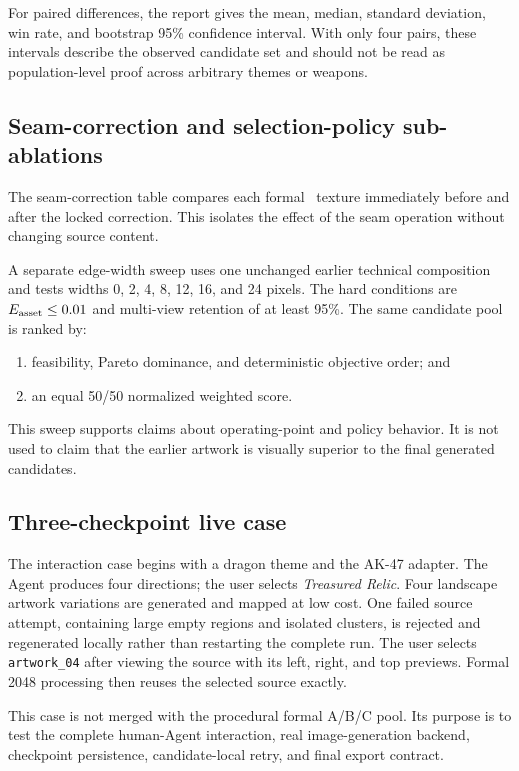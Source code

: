 For paired differences, the report gives the mean, median, standard deviation, win
rate, and bootstrap 95\% confidence interval. With only four pairs, these intervals
describe the observed candidate set and should not be read as population-level
proof across arbitrary themes or weapons.

\subsection{Seam-correction and selection-policy sub-ablations}

The seam-correction table compares each formal \routeB\ texture immediately before
and after the locked correction. This isolates the effect of the seam operation
without changing source content.

A separate edge-width sweep uses one unchanged earlier technical composition and
tests widths 0, 2, 4, 8, 12, 16, and 24 pixels. The hard conditions are
$E_{\mathrm{asset}}\leq0.01$ and multi-view retention of at least 95\%. The same candidate
pool is ranked by:

\begin{enumerate}
  \item feasibility, Pareto dominance, and deterministic objective order; and
  \item an equal 50/50 normalized weighted score.
\end{enumerate}

This sweep supports claims about operating-point and policy behavior. It is not
used to claim that the earlier artwork is visually superior to the final
generated candidates.

\subsection{Three-checkpoint live case}

The interaction case begins with a dragon theme and the AK-47 adapter. The Agent
produces four directions; the user selects \emph{Treasured Relic}. Four landscape
artwork variations are generated and mapped at low cost. One failed source
attempt, containing large empty regions and isolated clusters, is rejected and
regenerated locally rather than restarting the complete run. The user selects
\texttt{artwork\_04} after viewing the source with its left, right, and top
previews. Formal 2048 processing then reuses the selected source exactly.

This case is not merged with the procedural formal A/B/C pool. Its purpose is to
test the complete human-Agent interaction, real image-generation backend,
checkpoint persistence, candidate-local retry, and final export contract.


